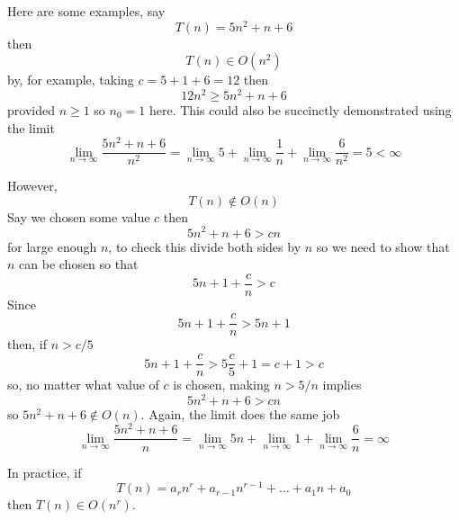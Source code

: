 \documentclass[11pt,a4paper]{scrartcl}
\begin{document}
Here are some examples, say 
\begin{equation}
T(n)=5n^2+n+6
\end{equation}
then 
\begin{equation}
T(n)\in O(n^2)
\end{equation}
by, for example, taking $c=5+1+6=12$ then 
\begin{equation}
12n^2\ge 5n^2+n+6
\end{equation}
provided $n\ge 1$ so $n_0=1$ here. This could also be succinctly demonstrated using the limit
\begin{equation}
\lim_{n\rightarrow \infty} \frac{5n^2+n+6}{n^2}=\lim_{n\rightarrow \infty}5+\lim_{n\rightarrow \infty}\frac{1}{n}+\lim_{n\rightarrow \infty}\frac{6}{n^2}=5<\infty
\end{equation}

However, 
\begin{equation}
T(n)\not\in O(n)
\end{equation}
Say we chosen some value $c$ then
\begin{equation}
5n^2+n+6>cn
\end{equation}
for large enough $n$, to check this divide both sides by $n$ so we need to show that $n$ can be chosen so that
\begin{equation}
5n+1+\frac{c}{n}>c
\end{equation}
Since 
\begin{equation}
5n+1+\frac{c}{n}>5n+1
\end{equation}
then, if $n>c/5$
\begin{equation}
5n+1+\frac{c}{n}>5\frac{c}{5}+1=c+1>c
\end{equation}
so, no matter what value of $c$ is chosen, making $n>5/n$ implies
\begin{equation}
5n^2+n+6>cn
\end{equation}
so $5n^2+n+6\not\in O(n)$. Again, the limit does the same job
\begin{equation}
\lim_{n\rightarrow \infty} \frac{5n^2+n+6}{n}=\lim_{n\rightarrow \infty}5n+\lim_{n\rightarrow \infty}1+\lim_{n\rightarrow \infty}\frac{6}{n}=\infty
\end{equation}


In practice, if
\begin{equation}
T(n)=a_rn^r+a_{r-1}n^{r-1}+\ldots+a_1n+a_0
\end{equation}
then $T(n)\in O(n^r)$. 
\end{document}
